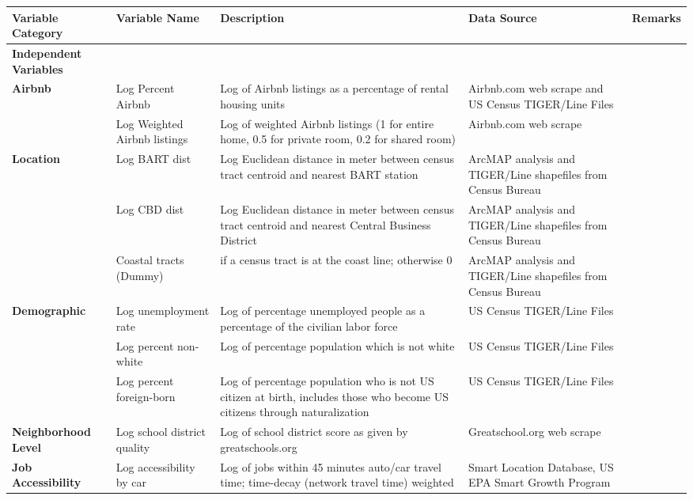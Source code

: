 \documentclass[10pt,letterpaper,onecolumn]{article}
\begin{document}
\begin{table}
\scriptsize
\def\arraystretch{1.5}
\begin{tabular}{>{\raggedright}p{3cm} >{\raggedright}p{3cm} >{\raggedright}p{3.5cm} >{\raggedright}p{3cm} >{\raggedright\arraybackslash}p{3cm}}
\toprule
\textbf{Variable \mbox{Category}}
  & \textbf{Variable Name}
  & \textbf{Description}
  & \textbf{Data Source}
  & \textbf{Remarks}\\
\midrule
\textbf{Independent Variables} & & & &\\
\midrule
\textbf{Airbnb}
  & Log Percent Airbnb
  & Log of Airbnb listings as a percentage of rental housing units
  & Airbnb.com web scrape and US Census TIGER/Line Files
  &\\
%
~ &Log Weighted Airbnb listings
  & Log of weighted Airbnb listings (1 for entire home, 0.5 for private room, 0.2 for shared room)
  & Airbnb.com web scrape
  &\\
%
\textbf{Location}
  & Log BART dist
  & Log Euclidean distance in meter between census tract centroid and nearest BART station
  & ArcMAP analysis and TIGER/Line shapefiles from Census Bureau
  &\\
%
~ & Log CBD dist
  & Log Euclidean distance in meter between census tract centroid and nearest Central Business District
  & ArcMAP analysis and TIGER/Line shapefiles from Census Bureau
  &\\
%
~ & Coastal tracts (Dummy)
  & if a census tract is at the coast line; otherwise 0
  & ArcMAP analysis and TIGER/Line shapefiles from Census Bureau
  &\\
%
\textbf{Demographic}
  & Log unemployment rate
  & Log of percentage unemployed people as a percentage of the civilian labor force
  & US Census TIGER/Line Files
  &\\
%
~ & Log percent non-white
  & Log of percentage population which is not white
  & US Census TIGER/Line Files
  &\\
%  
  & Log percent foreign-born
  & Log of percentage population who is not US citizen at birth, includes those who become US citizens through naturalization
  & US Census TIGER/Line Files
  &\\
%
\textbf{Neighborhood Level}
  & Log school district quality
  & Log of school district score as given by greatschools.org
  & Greatschool.org web scrape
  &\\
%
\textbf{Job Accessibility}
  & Log accessibility by car
  & Log of jobs within 45 minutes auto/car travel time; time-decay (network travel time) weighted
  & Smart Location Database, US EPA Smart Growth Program

\end{tabular}
\end{table}
\end{document}
